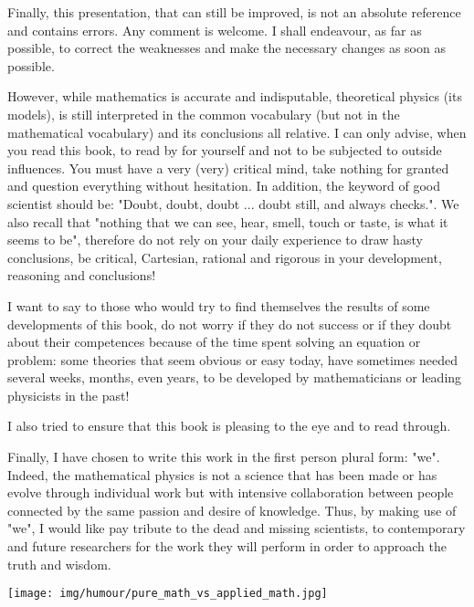	Finally, this presentation, that can still be improved, is not an absolute reference and contains errors. Any comment is welcome. I shall endeavour, as far as possible, to correct the weaknesses and make the necessary changes as soon as possible.
	
	However, while mathematics is accurate and indisputable, theoretical physics (its models), is still interpreted in the common vocabulary (but not in the mathematical vocabulary) and its conclusions all relative. I can only advise, when you read this book, to read by for yourself and not to be subjected to outside influences. You must have a very (very) critical mind, take nothing for granted and question everything without hesitation. In addition, the keyword of good scientist should be: "Doubt, doubt, doubt ... doubt still, and always checks.". We also recall that "nothing that we can see, hear, smell, touch or taste, is what it seems to be", therefore do not rely on your daily experience to draw hasty conclusions, be critical, Cartesian, rational and rigorous in your development, reasoning and conclusions!
	
	I want to say to those who would try to find themselves the results of some developments of this book, do not worry if they do not success or if they doubt about their competences because of the time spent solving an equation or problem: some theories that seem obvious or easy today, have sometimes needed several weeks, months, even years, to be developed by mathematicians or leading physicists in the past!
	
	I also tried to ensure that this book is pleasing to the eye and to read through.
	
	Finally, I have chosen to write this work in the first person plural form: "we". Indeed, the mathematical physics is not a science that has been made or has evolve through individual work but with intensive collaboration between people connected by the same passion and desire of knowledge. Thus, by making use of "we", I would like pay tribute to the dead and missing scientists, to contemporary and future researchers for the work they will perform in order to approach the truth and wisdom.
	
	\begin{center}
	\texttt{[image: img/humour/pure\_math\_vs\_applied\_math.jpg]}
	\end{center}

	\newpage
	\thispagestyle{empty}
	\mbox{}
